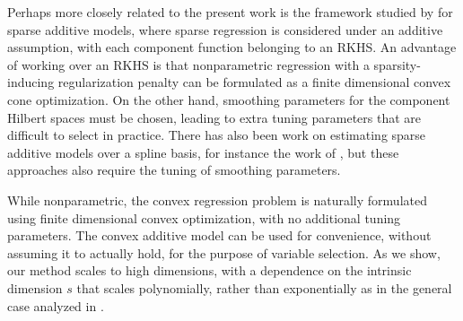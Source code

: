 Perhaps more closely related to the present work is the framework
studied by \cite{Raskutti:12} for sparse additive models, where sparse
regression is considered under an additive assumption, with each
component function belonging to an RKHS.  An advantage of working over
an RKHS is that nonparametric regression with a sparsity-inducing
regularization penalty can be formulated as a finite dimensional
convex cone optimization.  On the other hand, smoothing parameters for
the component Hilbert spaces must be chosen, leading to extra tuning
parameters that are difficult to select in practice. There has also been
work on estimating sparse additive models over a spline basis, for 
instance the work of \cite{huang2010variable}, but these approaches also
require the tuning of smoothing parameters. 

While nonparametric, the convex regression problem is naturally
formulated using finite dimensional convex optimization, with no
additional tuning parameters. The convex additive model can be used
for convenience, without assuming it to actually hold, for the purpose
of variable selection. As we show, our method scales to high
dimensions, with a dependence on the intrinsic dimension $s$ that
scales polynomially, rather than exponentially as in the general case
analyzed in \cite{dalalyan:12}. 



%
%
%
%
%
%
%
%


